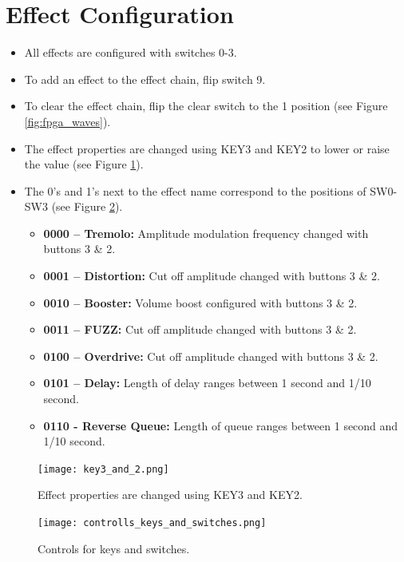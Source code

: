 \documentclass{article}
\begin{document}
\section{Effect Configuration}
\begin{itemize}
    \item All effects are configured with switches 0-3.
    \item To add an effect to the effect chain, flip switch 9.
    \item To clear the effect chain, flip the clear switch to the 1 position (see Figure \ref{fig:fpga_waves}).
    \item The effect properties are changed using KEY3 and KEY2 to lower or raise the value (see Figure \ref{fig:key3_and_2}).
    \item The 0’s and 1’s next to the effect name correspond to the positions of SW0-SW3 (see Figure \ref{fig:controls_keys_and_switches}).
    \begin{itemize}
        \item \textbf{0000 – Tremolo:} Amplitude modulation frequency changed with buttons 3 \& 2.
        \item \textbf{0001 – Distortion:} Cut off amplitude changed with buttons 3 \& 2.
        \item \textbf{0010 – Booster:} Volume boost configured with buttons 3 \& 2.
        \item \textbf{0011 – FUZZ:} Cut off amplitude changed with buttons 3 \& 2.
        \item \textbf{0100 – Overdrive:} Cut off amplitude changed with buttons 3 \& 2.
        \item \textbf{0101 – Delay:} Length of delay ranges between 1 second and 1/10 second.
        \item \textbf{0110 - Reverse Queue:} Length of queue ranges between 1 second and 1/10 second.
    \end{itemize}
\end{itemize}

\begin{figure}[h]
    \centering
    \texttt{[image: key3\_and\_2.png]}
    \caption{Effect properties are changed using KEY3 and KEY2.}
    \label{fig:key3_and_2}
\end{figure}

\begin{figure}[h]
    \centering
    \texttt{[image: controlls\_keys\_and\_switches.png]}
    \caption{Controls for keys and switches.}
    \label{fig:controls_keys_and_switches}
\end{figure}
\end{document}
